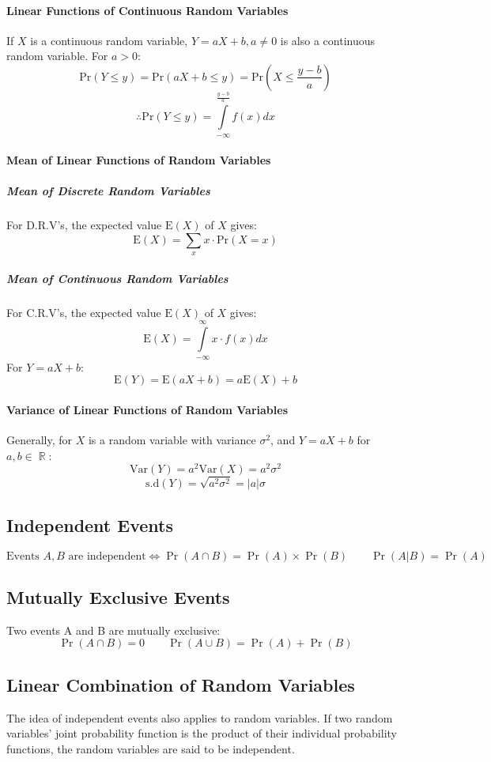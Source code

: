 \documentclass[a4paper,twoside,10pt]{article}
\DeclareMathOperator\R{\mathbb{R}}
\begin{document}
			\paragraph{Linear Functions of Continuous Random Variables} If $X$ is a continuous random variable, $Y=aX+b,a\neq0$ is also a continuous random variable. For $a>0$:
			\[
				\mathrm{Pr}(Y\leq y)=\mathrm{Pr}(aX+b\leq y)=\mathrm{Pr}\left(X\leq\frac{y-b}{a}\right)
			\]
			\[
				\therefore \mathrm{Pr}(Y\leq y)=\int\limits_{-\infty}^{\frac{y-b}{a}}f(x)dx
			\]
			
			\paragraph{Mean of Linear Functions of Random Variables}
				\subparagraph{Mean of Discrete Random Variables} For D.R.V's, the expected value $\mathrm{E}(X)$ of $X$ gives:
					\[
					\mathrm{E}(X)=\sum\limits_xx\cdot\mathrm{Pr}(X=x)
					\]
				\subparagraph{Mean of Continuous Random Variables} For C.R.V's, the expected value $\mathrm{E}(X)$ of $X$ gives:
					\[
					\mathrm{E}(X)=\int\limits_{-\infty}^{\infty}x\cdot f(x)dx
					\]
				For $Y=aX+b$:
				\[
					\mathrm{E}(Y)=\mathrm{E}(aX+b)=a\mathrm{E}(X)+b
				\]
			
			\paragraph{Variance of Linear Functions of Random Variables} Generally, for $X$ is a random variable with variance $\sigma^2$, and $Y=aX+b$ for $a,b\in\R$:
			\[
				\mathrm{Var}(Y)=a^2\mathrm{Var}(X)=a^2\sigma^2
			\]
			\[
				\mathrm{s.d}(Y)=\sqrt{a^2\sigma^2}=|a|\sigma
			\]
		\subsection{Independent Events}
			\[
				\text{Events }A,B\text{ are independent}\iff\Pr(A\cap B)=\Pr(A)\times\Pr(B)\qquad \Pr(A|B)=\Pr(A)
			\]
		\subsection{Mutually Exclusive Events}
			Two events A and B are mutually exclusive:
			\[
				\Pr(A\cap B)=0\qquad \Pr(A\cup B)=\Pr(A)+\Pr(B)
			\]
		\subsection{Linear Combination of Random Variables}
			The idea of independent events also applies to random variables. If two random variables' joint probability function is the product of their individual probability functions, the random variables are said to be independent.
			
\end{document}
